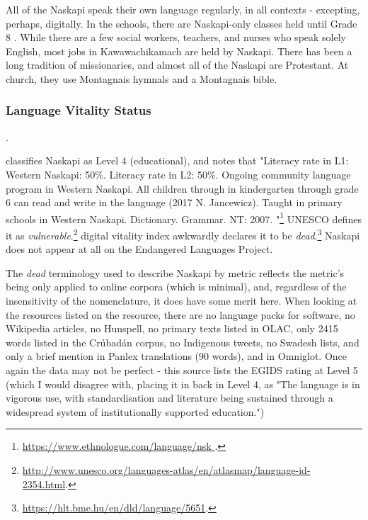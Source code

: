 All of the Naskapi speak their own language regularly, in all contexts - excepting, perhaps, digitally. In the schools, there are Naskapi-only classes held until Grade 8 \cite{llewellyn2017oral}. While there are a few social workers, teachers, and nurses who speak solely English, most jobs in Kawawachikamach are held by Naskapi. There has been a long tradition of missionaries, and almost all of the Naskapi are Protestant. At church, they use Montagnais hymnals and a Montagnais bible.



\subsubsection{Language Vitality Status}
\label{sec:naskapi-vitality-status}.

\citet{lewis2009ethnologue} classifies Naskapi as Level 4 (educational), and notes that "Literacy rate in L1: Western Naskapi: 50\%. Literacy rate in L2: 50\%. Ongoing community language program in Western Naskapi. All children through in kindergarten through grade 6 can read and write in the language (2017 N. Jancewicz). Taught in primary schools in Western Naskapi. Dictionary. Grammar. NT: 2007. "\footnote{\href{https://www.ethnologue.com/language/nsk }{https://www.ethnologue.com/language/nsk }. } UNESCO defines it as {\it vulnerable}.\footnote{\href{http://www.unesco.org/languages-atlas/en/atlasmap/language-id-2354.html}{http://www.unesco.org/languages-atlas/en/atlasmap/language-id-2354.html}. }  digital vitality index awkwardly declares it to be {\it dead}.\footnote{\href{https://hlt.bme.hu/en/dld/language/5651}{https://hlt.bme.hu/en/dld/language/5651}. } Naskapi does not appear at all on the Endangered Languages Project.

The {\it dead} terminology used to describe Naskapi by  metric reflects the metric's being only applied to online corpora (which is minimal), and, regardless of the insensitivity of the nomenclature, it does have some merit here. When looking at the resources listed on the resource, there are no language packs for software, no Wikipedia articles, no Hunspell, no primary texts listed in OLAC, only 2415 words listed in the Cr\'ubad\'an corpus, no Indigenous tweets, no Swadesh lists, and only a brief mention in Panlex translations (90 words), and in Omniglot. Once again the data may not be perfect - this source lists the EGIDS rating at Level 5 (which I would disagree with, placing it in back in Level 4, as "The language is in vigorous use, with standardisation and literature being sustained through a widespread system of institutionally supported education.")

